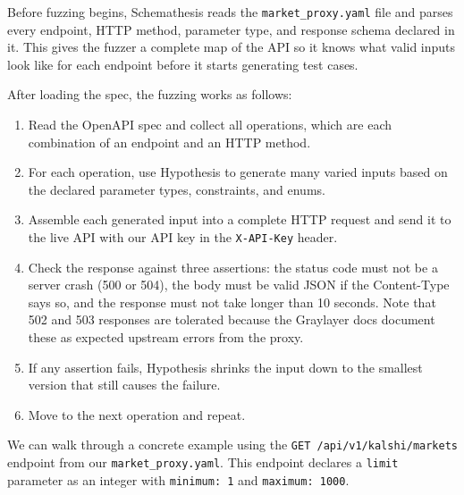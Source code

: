 \documentclass[12pt]{article}
\begin{document}
Before fuzzing begins, Schemathesis reads the
\texttt{market\_proxy.yaml} file and parses every endpoint, HTTP
method, parameter type, and response schema declared in it. This
gives the fuzzer a complete map of the API so it knows what valid
inputs look like for each endpoint before it starts generating test
cases.

After loading the spec, the fuzzing works as follows:

\begin{enumerate}
  \item Read the OpenAPI spec and collect all operations, which are
  each combination of an endpoint and an HTTP method.
  \item For each operation, use Hypothesis to generate many varied
  inputs based on the declared parameter types, constraints, and
  enums.
  \item Assemble each generated input into a complete HTTP request
  and send it to the live API with our API key in the
  \texttt{X-API-Key} header.
  \item Check the response against three assertions: the status
  code must not be a server crash (500 or 504), the body must be
  valid JSON if the Content-Type says so, and the response must
  not take longer than 10 seconds. Note that 502 and 503 responses
  are tolerated because the Graylayer docs document these as
  expected upstream errors from the proxy.
  \item If any assertion fails, Hypothesis shrinks the input down
  to the smallest version that still causes the failure.
  \item Move to the next operation and repeat.
\end{enumerate}

We can walk through a concrete example using the
\texttt{GET /api/v1/kalshi/markets} endpoint from our
\texttt{market\_proxy.yaml}. This endpoint declares a \texttt{limit}
parameter as an integer with \texttt{minimum: 1} and
\texttt{maximum: 1000}.
\end{document}
